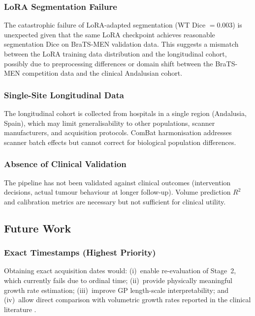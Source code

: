 \subsubsection{LoRA Segmentation Failure}

The catastrophic failure of LoRA-adapted segmentation (WT Dice $= 0.003$)
is unexpected given that the same LoRA checkpoint achieves reasonable
segmentation Dice on BraTS-MEN validation data. This suggests a mismatch
between the LoRA training data distribution and the longitudinal cohort,
possibly due to preprocessing differences or domain shift between the
BraTS-MEN competition data and the clinical Andalusian cohort.

\subsubsection{Single-Site Longitudinal Data}

The longitudinal cohort is collected from hospitals in a single region
(Andalusia, Spain), which may limit generalisability to other populations,
scanner manufacturers, and acquisition protocols. ComBat harmonisation
addresses scanner batch effects but cannot correct for biological population
differences.

\subsubsection{Absence of Clinical Validation}

The pipeline has not been validated against clinical outcomes (intervention
decisions, actual tumour behaviour at longer follow-up). Volume prediction
$R^2$ and calibration metrics are necessary but not sufficient for clinical
utility.

\subsection{Future Work}
\label{sec:conc:future}

\subsubsection{Exact Timestamps (Highest Priority)}

Obtaining exact acquisition dates would: (i)~enable re-evaluation of Stage~2,
which currently fails due to ordinal time; (ii)~provide physically meaningful
growth rate estimation; (iii)~improve GP length-scale interpretability; and
(iv)~allow direct comparison with volumetric growth rates reported in the
clinical literature \cite{hashimoto2012natural,nakamura2003natural,
engelhardt2023gompertz}.

